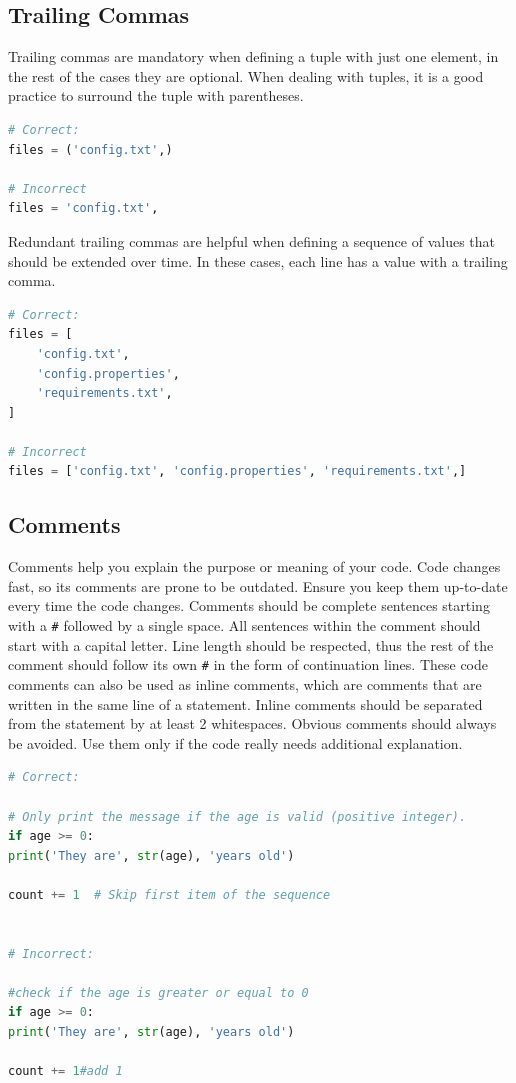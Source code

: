 \documentclass{tufte-handout}
\begin{document}
\subsection{Trailing Commas}
Trailing commas are mandatory when defining a tuple with just one element, in the rest of the cases they are optional.
When dealing with tuples, it is a good practice to surround the tuple with parentheses.

\begin{lstlisting}[numbers=none,language=python]
# Correct:
files = ('config.txt',)

# Incorrect
files = 'config.txt',
\end{lstlisting}

Redundant trailing commas are helpful when defining a sequence of values that should be extended over time.
In these cases, each line has a value with a trailing comma.

\begin{lstlisting}[numbers=none,language=python]
# Correct:
files = [
    'config.txt',
    'config.properties',
    'requirements.txt',
]

# Incorrect
files = ['config.txt', 'config.properties', 'requirements.txt',]
\end{lstlisting}

\subsection{Comments}

Comments help you explain the purpose or meaning of your code.
Code changes fast, so its comments are prone to be outdated.
Ensure you keep them up-to-date every time the code changes.
Comments should be complete sentences starting with a \texttt{\#} followed by a single space.
All sentences within the comment should start with a capital letter.
Line length should be respected, thus the rest of the comment should follow its own \texttt{\#} in the form of continuation lines.
These code comments can also be used as inline comments, which are comments that are written in the same line of a statement.
Inline comments should be separated from the statement by at least 2 whitespaces.
Obvious comments should always be avoided. 
Use them only if the code really needs additional explanation.

\begin{lstlisting}[numbers=none,language=python]
# Correct:

# Only print the message if the age is valid (positive integer).
if age >= 0: 
print('They are', str(age), 'years old')

count += 1  # Skip first item of the sequence


# Incorrect:

#check if the age is greater or equal to 0
if age >= 0: 
print('They are', str(age), 'years old')

count += 1#add 1
\end{lstlisting}
\end{document}
